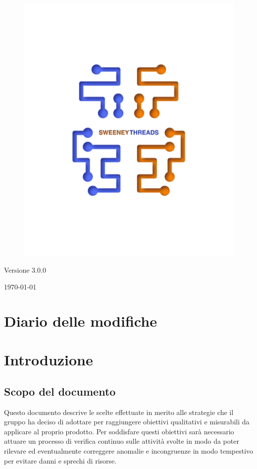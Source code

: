 \documentclass[a4paper]{article}
\begin{document}
\begin{titlepage}
		\begin{figure}[H]
			\centering
			\includegraphics[scale=0.8]{sweeney.png}
		\end{figure}
		\begin{center}
			Versione 3.0.0
		\end{center}
		{\large \today}\\[3cm] 
		\vfill  
	\end{titlepage}
	
	\tableofcontents
	\newpage
	\section*{Diario delle modifiche}
     
	\newpage
    \section{Introduzione}
		\subsection{Scopo del documento}
			Questo documento descrive le scelte effettuate in merito alle strategie 
			che il gruppo ha deciso di adottare per raggiungere obiettivi qualitativi e misurabili da 
			applicare al proprio prodotto. Per soddisfare questi obiettivi sarà necessario attuare un 
			processo di verifica continuo sulle attività svolte in modo da poter rilevare ed eventualmente 
			correggere anomalie e incongruenze in modo tempestivo per evitare danni e sprechi di risorse.
\end{document}
